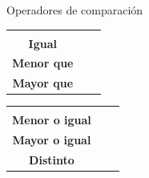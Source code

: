 \documentclass{beamer}
\begin{document}
\begin{frame}{Operadores de comparación}
    \begin{center}
        \begin{tabular}{ccc}
            \begin{minipage}{2.5cm}
                \centering
                {\Large =}\\[0.1cm]
                \textbf{Igual}
            \end{minipage} &
            \begin{minipage}{2.5cm}
                \centering
                {\Large $<$}\\[0.1cm]
                \textbf{Menor que}
            \end{minipage} &
            \begin{minipage}{2.5cm}
                \centering
                {\Large $>$}\\[0.1cm]
                \textbf{Mayor que}
            \end{minipage}
        \end{tabular}
        
        \vspace{0.5cm}
        
        \begin{tabular}{ccc}
            \begin{minipage}{2.5cm}
                \centering
                {\Large $<=$}\\[0.1cm]
                \textbf{Menor o igual}
            \end{minipage} &
            \begin{minipage}{2.5cm}
                \centering
                {\Large $>=$}\\[0.1cm]
                \textbf{Mayor o igual}
            \end{minipage} &
            \begin{minipage}{2.5cm}
                \centering
                {\Large $<>$ o $!=$}\\[0.1cm]
                \textbf{Distinto}
            \end{minipage}
        \end{tabular}
    \end{center}
\end{frame}
\end{document}
